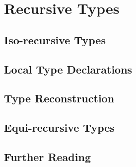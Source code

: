 \chapter{Recursive Types}

\section{Iso-recursive Types}

\section{Local Type Declarations}

\section{Type Reconstruction}

\section{Equi-recursive Types}

\section{Further Reading}

